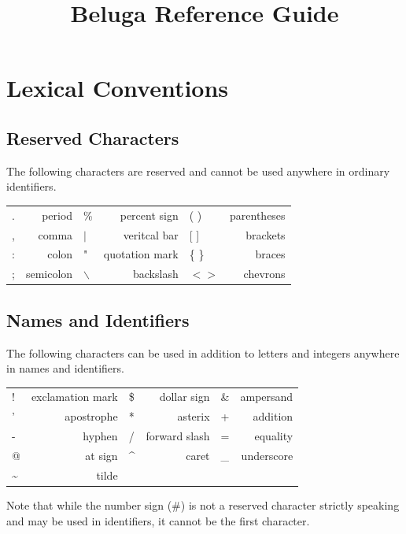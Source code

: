 \documentclass[11pt]{article}
\begin{document}
\PackageError{USERGUIDE}{Use the doc/userguide.tex in the beluga repository.}{THIS IS FROZEN}





\title{Beluga Reference Guide}

\author{}
\date{}
\maketitle

\newpage

\section{Lexical Conventions}
\subsection{Reserved Characters}
The following characters are reserved and cannot be used anywhere in ordinary identifiers.
\begin{center}
\begin{tabular}{ | l r | l r | l r }
  . & period & \% & percent sign &  ( )  & parentheses \\
 , & comma & $\vert$ & veritcal bar & [ ] & brackets\\
: & colon &  " & quotation mark  & \{ \} & braces  \\ 
; & semicolon & $\backslash$ & backslash  & $< >$ & chevrons  \\
\end{tabular}
\end{center}

\subsection{Names and Identifiers}
The following characters can be used in addition to letters and integers anywhere in names and identifiers.
\begin{center}
\begin{tabular}{ | l r | l r | l r }
 ! & exclamation mark & \$ & dollar sign & \& & ampersand\\
' & apostrophe &  * & asterix  & + & addition \\ 
- & hyphen & / & forward slash  & = & equality  \\
@ & at sign & \^{} & caret  &  \_  & underscore  \\
\~{} & tilde &\\
\end{tabular}
\end{center}
Note that while the number sign (\#) is not a reserved  character strictly speaking and may be used in identifiers, it cannot be the first character.  
\end{document}
